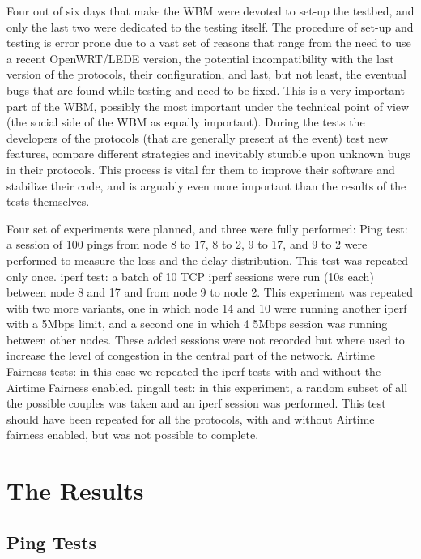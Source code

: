 \documentclass[10pt,onecolumn]{paper}
\begin{document}
Four out of six days that make the WBM were devoted to set-up the testbed, and
only the last two were dedicated to the testing itself. The procedure of set-up
and testing is error prone due to a vast set of reasons that range from the need
to use a recent OpenWRT/LEDE version, the potential incompatibility with the
last version of the protocols, their configuration, and last, but not least, the
eventual bugs that are found while testing and need to be fixed. This is a very
important part of the WBM, possibly the most important under the technical
point of view (the social side of the WBM as equally important). During the
tests the developers of the protocols (that are generally present at the event)
test new features, compare different strategies and inevitably stumble upon
unknown bugs in their protocols. This process is vital for them to improve their
software and stabilize their code, and is arguably even more important than the
results of the tests themselves. 

Four set of experiments were planned, and three were fully performed:
\bi
\ii Ping test: a session of 100 pings from node 8 to 17, 8 to 2, 9 to 17, and 9
to 2 were performed to measure the loss and the delay distribution. This test
was repeated only once.
\ii iperf test: a batch of 10 TCP iperf sessions were run (10s each) between node 8
and 17 and from node 9 to node 2. This experiment was repeated with two more
variants, one in which node 14 and 10 were running another iperf with a 5Mbps
limit, and a second one in which 4 5Mbps session was running between other
nodes. These added sessions were not recorded but where used to increase
the level of congestion in the central part of the network.
\ii Airtime Fairness tests: in this case we repeated the iperf tests with and
without the Airtime Fairness enabled.
\ii pingall test: in this experiment, a random subset of all the possible
couples was taken and an iperf session was performed. This test should have been
repeated for all the protocols, with and without Airtime fairness enabled, but
was not possible to complete.
\ei

\section{The Results}

\subsection{Ping Tests}
\end{document}
